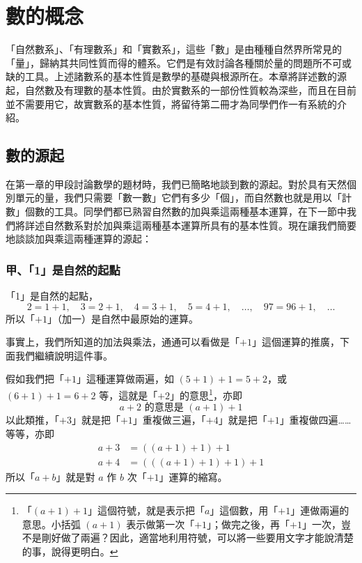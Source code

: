 
\section{數的概念}\label{sec:ch3}

「自然數系」、「有理數系」和「實數系」，這些「數」是由種種自然界所常見的「量」，歸納其共同性質而得的體系。它們是有效討論各種關於量的問題所不可或缺的工具。上述諸數系的基本性質是數學的基礎與根源所在。本章將詳述數的源起，自然數及有理數的基本性質。由於實數系的一部份性質較為深些，而且在目前並不需要用它，故實數系的基本性質，將留待第二冊才為同學們作一有系統的介紹。

\subsection{數的源起}\label{sec:3-1}

在第一章的甲段討論數學的題材時，我們已簡略地談到數的源起。對於具有天然個別單元的量，我們只需要「數一數」它們有多少「個」，而自然數也就是用以「計數」個數的工具。同學們都已熟習自然數的加與乘這兩種基本運算，在下一節中我們將詳述自然數系對於加與乘這兩種基本運算所具有的基本性質。現在讓我們簡要地談談加與乘這兩種運算的源起：

\subsubsection*{甲、「1」是自然的起點}\label{subsec:plus_one}

「1」是自然的起點，
\begin{equation*}
  2=1+1, \quad 3=2+1, \quad 4=3+1, \quad 5=4+1, \quad \dots, \quad 97=96+1, \quad \dots
\end{equation*}
所以「$+1$」（加一）是自然中最原始的運算。

事實上，我們所知道的加法與乘法，通通可以看做是「$+1$」這個運算的推廣，下面我們繼續說明這件事。

假如我們把「$+1$」這種運算做兩遍，如 $(5+1)+1=5+2$，或 $(6+1)+1=6+2$ 等，這就是「$+2$」的意思\footnote{「$(a+1)+1$」這個符號，就是表示把「$a$」這個數，用「$+1$」連做兩遍的意思。小括弧 $(a+1)$ 表示做第一次「$+1$」；做完之後，再「$+1$」一次，豈不是剛好做了兩遍？因此，適當地利用符號，可以將一些要用文字才能說清楚的事，說得更明白。}，亦即
\begin{equation*}
  a+2 \text{ 的意思是 } (a+1)+1
\end{equation*}
以此類推，「$+3$」就是把「$+1$」重複做三遍，「$+4$」就是把「$+1$」重複做四遍……等等，亦即
\begin{align*}
  a+3 &= ((a+1)+1)+1 \\
  a+4 &= (((a+1)+1)+1)+1
\end{align*}
所以「$a+b$」就是對 $a$ 作 $b$ 次「$+1$」運算的縮寫。

